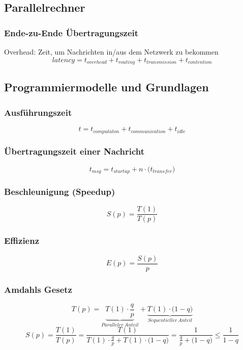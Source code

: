 \subsection{Parallelrechner}

\subsubsection{Ende-zu-Ende Übertragungszeit}
Overhead: Zeit, um Nachrichten in/aus dem Netzwerk zu bekommen
\begin{equation}
	latency = t_{overhead} + t_{routing} + t_{transmission} + t_{contention}
\end{equation}


\subsection{Programmiermodelle und Grundlagen}

\subsubsection{Ausführungszeit}
\begin{equation}
	t = t_{computaton} + t_{communication} + t_{idle}
\end{equation}

\subsubsection{Übertragungszeit einer Nachricht}
\begin{equation}
	t_{msg} = t_{startup} + n \cdot \big( t_{transfer} \big)
\end{equation}

\subsubsection{Beschleunigung (Speedup)}
\begin{equation}
	S(p) = \frac{T(1)}{T(p)}
\end{equation}

\subsubsection{Effizienz}
\begin{equation}
	E(p) = \frac{S(p)}{p}
\end{equation}

\subsubsection{Amdahls Gesetz}
\begin{equation}
	T(p) = \underbrace{T(1) \cdot \frac{q}{p}}_{Paralleler~Anteil} + \underbrace{T(1) \cdot \big(1-q\big)}_{Sequentieller~Anteil}
\end{equation}
\begin{equation}
	S(p) = \frac{T(1)}{T(p)} = \frac{T(1)}{T(1) \cdot \frac{q}{p} + T(1) \cdot \big(1-q\big)} = \frac{1}{\frac{q}{p} + \big( 1 - q \big)} \le \frac{1}{1-q}
\end{equation}